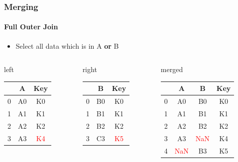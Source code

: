\documentclass[english]{beamer}
\def\firstcircle{(0,0) circle (2cm)}
\def\secondcircle{(0:3cm) circle (2cm)}
\begin{document}
\begin{frame}
\frametitle{Merging}
\framesubtitle{Full Outer Join}

\begin{itemize}
\item Select all data which is in A \textbf{or} B
\end{itemize}

\begin{center}
\end{center}

{\footnotesize
\begin{columns}
\begin{column}{0.3\textwidth}
left \\
\begin{tabular}{c|cc} \toprule
   & A  &  Key \\ \midrule
0 & A0 &  K0 \\
1 & A1 &  K1 \\ 
2 & A2 &  K2 \\
3 & A3 &  \textcolor{red}{K4} \\ \bottomrule
\end{tabular}
\vspace*{1.2em}
\end{column}
\begin{column}{0.27\textwidth}
right \\
\begin{tabular}{c|cc} \toprule
   &  B   & Key \\ \midrule
0 &  B0 & K0 \\
1 &  B1 & K1 \\ 
2 &  B2 & K2 \\
3 &  C3 & \textcolor{red}{K5} \\ \bottomrule
\end{tabular}
\vspace*{1.2em}
\end{column}
\begin{column}{0.3\textwidth}
merged \\
\begin{tabular}{c|ccc} \toprule
   & A  & B   & Key \\ \midrule
0 & A0 & B0 & K0 \\
1 & A1 & B1 & K1 \\ 
2 & A2 & B2 & K2 \\ 
3 & A3 & \textcolor{red}{NaN} & K4 \\ 
4 & \textcolor{red}{NaN} & B3 & K5 \\ \bottomrule
\end{tabular} \\
\vspace*{0.2em}
\end{column}
\end{columns}}

\end{frame}
\end{document}
